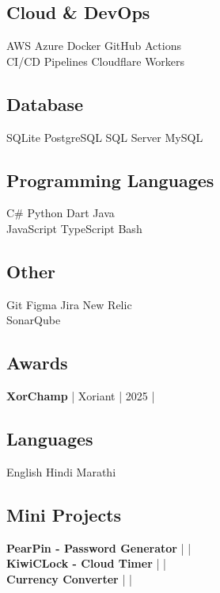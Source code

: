 \documentclass[]{deedy-resume-reversed}
\begin{document}
\begin{minipage}[t]{0.33\textwidth}
\subsection{Cloud \& DevOps}
AWS \textbullet Azure \textbullet Docker \textbullet GitHub Actions \\
CI/CD Pipelines \textbullet Cloudflare Workers \\
\sectionsep

\subsection{Database}
SQLite \textbullet PostgreSQL \textbullet SQL Server \textbullet MySQL
\sectionsep

\subsection{Programming Languages}
C\# \textbullet Python \textbullet Dart \textbullet Java \\
JavaScript \textbullet TypeScript \textbullet Bash 
\sectionsep

\subsection{Other}
Git \textbullet Figma \textbullet Jira \textbullet New Relic\\
SonarQube 
\sectionsep

\subsection{Awards}
\textbf{XorChamp} | Xoriant | 2025  | 
\href{https://github.com/sunnydodti/resume/blob/main/awards/XorChamp%20-%20Sunny%20Dodti.pdf}{\faExternalLink } 
\sectionsep

\subsection{Languages}
English \textbullet Hindi \textbullet Marathi
\sectionsep

\subsection{Mini Projects}

\textbf{PearPin - Password Generator} | \href{https://github.com/sunnydodti/pearpin}{\faGithub} | \href{https://pearpin.persist.site}{\faExternalLink} \\

\textbf{KiwiCLock - Cloud Timer} | \href{https://github.com/sunnydodti/kiwiclock}{\faGithub} | \href{https://kiwiclock.persist.site}{\faExternalLink} \\

\textbf{Currency Converter} | \href{https://github.com/sunnydodti/currency_converter}{\faGithub} | \href{https://sunnydodti.github.io/currency_converter}{\faExternalLink}
\sectionsep

\end{minipage}
\end{document}
